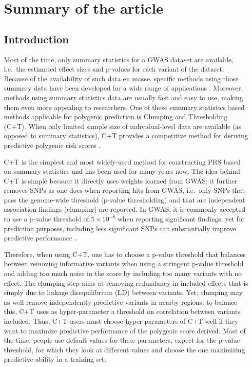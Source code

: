 \section{Summary of the article}

\subsection{Introduction}

Most of the time, only summary statistics for a GWAS dataset are available, i.e.\ the estimated effect sizes and p-values for each variant of the dataset. Because of the availability of such data en masse, specific methods using those summary data have been developed for a wide range of applications \cite[]{pasaniuc2014fast,vilhjalmsson2015modeling,bulik2015ld,pasaniuc2017dissecting,speed2018sumher}. Moreover, methods using summary statistics data are usually fast and easy to use, making them even more appealing to researchers.
One of these summary statistics based methods applicable for polygenic prediction is Clumping and Thresholding (C+T).
When only limited sample size of individual-level data are available (as opposed to summary statistics), C+T provides a competitive method for deriving predictive polygenic risk scores \cite[]{prive2019efficient}.

C+T is the simplest and most widely-used method for constructing PRS based on summary statistics and has been used for many years now. The idea behind C+T is simple because it directly uses weights learned from GWAS; it further removes SNPs as one does when reporting hits from GWAS, i.e.\ only SNPs that pass the genome-wide threshold (p-value thresholding) and that are independent association findings (clumping) are reported.
In GWAS, it is commonly accepted to use a p-value threshold of $5 \times 10^{-8}$ when reporting significant findings, yet for prediction purposes, including less significant SNPs can substantially improve predictive performance \cite[]{purcell2009common}.

Therefore, when using C+T, one has to choose a p-value threshold that balances between removing informative variants when using a stringent p-value threshold and adding too much noise in the score by including too many variants with no effect. The clumping step aims
at removing redundancy in included effects that is simply due to linkage disequilibrium (LD) between variants. Yet, clumping may as well remove independently predictive variants in nearby regions; to balance this, C+T uses as hyper-parameter a threshold on correlation between variants included. 
Thus, C+T users must choose hyper-parameters of C+T well if they want to maximize predictive performance of the polygenic score derived.
Most of the time, people use default values for these parameters, expect for the p-value threshold, for which they look at different values and choose the one maximizing predictive ability in a training set.

